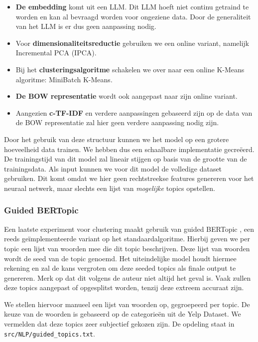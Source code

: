 \begin{itemize}
    \item \textbf{De embedding} komt uit een LLM. Dit LLM hoeft niet continu getraind te worden en kan al bevraagd worden voor ongeziene data. Door de generaliteit van het LLM is er dus geen aanpassing nodig.
    \item Voor \textbf{dimensionaliteitsreductie} gebruiken we een online variant, namelijk Incremental PCA (IPCA).
    \item Bij het \textbf{clusteringsalgoritme} schakelen we over naar een online K-Means algoritme: MiniBatch K-Means.
    \item \textbf{De BOW representatie} wordt ook aangepast naar zijn online variant.
    \item Aangezien \textbf{c-TF-IDF} en verdere aanpassingen gebaseerd zijn op de data van de BOW representatie zal hier geen verdere aanpassing nodig zijn.
\end{itemize}


Door het gebruik van deze structuur kunnen we het model op een grotere hoeveelheid data trainen. We hebben dus een schaalbare implementatie gecreëerd. De trainingstijd van dit model zal lineair stijgen op basis van de grootte van de trainingsdata. Als input kunnen we voor dit model de volledige dataset gebruiken. Dit komt omdat we hier geen rechtstreekse features genereren voor het neuraal netwerk, maar slechts een lijst van \textit{mogelijke} topics opstellen.

\subsubsection{Guided BERTopic}
Een laatste experiment voor clustering maakt gebruik van guided BERTopic \cite{bertopic_guided}, een reeds geïmplementeerde variant op het standaardalgoritme. Hierbij geven we per topic een lijst van woorden mee die dit topic beschrijven. Deze lijst van woorden wordt de seed van de topic genoemd. Het uiteindelijke model houdt hiermee rekening en zal de kans vergroten om deze seeded topics als finale output te genereren. Merk op dat dit volgens de auteur niet altijd het geval is. Vaak zullen deze topics aangepast of opgesplitst worden, tenzij deze extreem accuraat zijn.

We stellen hiervoor manueel een lijst van woorden op, gegroepeerd per topic. De keuze van de woorden is gebaseerd op de categorieën uit de Yelp Dataset. We vermelden dat deze topics zeer subjectief gekozen zijn. De opdeling staat in \verb|src/NLP/guided_topics.txt|.

